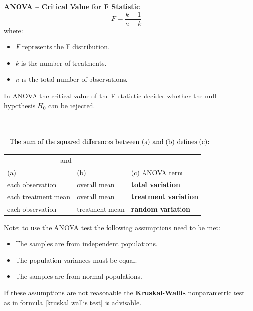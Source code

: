 \documentclass[	DIV=calc,%
							paper=a4,%
							fontsize=11pt,%
							twocolumn]{scrartcl} %
\newcommand{\hformbar}[1]{\vspace{5pt}\hrule\vspace{10pt}} %
\newcommand{\formdesc}[1]{\noindent\textbf{#1}}
\begin{document}
\formdesc{ANOVA -- Critical Value for F Statistic}
\begin{equation}
\label{critical value for f statistic}
F = \frac{k-1}{n-k}
\end{equation}
where:
\begin{itemize}
 \item $F$ represents the F distribution.
 \item $k$ is the number of treatments.
 \item $n$ is the total number of observations.
\end{itemize}
In ANOVA the critical value of the F statistic decides whether the null hypothesis $H_{0}$ can be rejected. 
\hformbar


\formdesc{ANOVA -- Components} \\
\begin{equation}
\label{anova components}
\vbox{\noindent The sum of the squared differences between (a) and (b) defines (c):}
\end{equation}
\begin{table}[!h] %
  \begin{scriptsize} %
  \begin{tabular}{lll}  
  \toprule
  \multicolumn{2}{c}{and} \\
  \cmidrule(r){1-2}
  (a)    &(b)    &(c) ANOVA term\\
  \midrule
  each observation     & overall mean    & \textbf{total variation}  \\
  each treatment mean  & overall mean    & \textbf{treatment variation} \\
  each observation     & treatment mean  & \textbf{random variation} \\
  \bottomrule
  \end{tabular}
  \end{scriptsize}
\end{table}
\newline
Note: to use the ANOVA test the following assumptions need to be met:
\begin{itemize}
 \item The samples are from independent populations.
 \item The population variances must be equal.
 \item The samples are from normal populations.
\end{itemize}
If these assumptions are not reasonable the \textbf{Kruskal-Wallis} nonparametric test as in formula \eqref{kruskal wallis test} is advisable.
\end{document}
